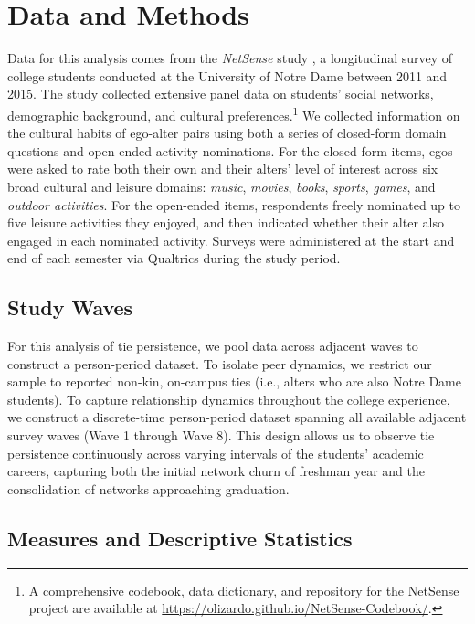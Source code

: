 \documentclass[
  letterpaper,
  DIV=11,
  numbers=noendperiod]{scrartcl}
\begin{document}
\section{Data and Methods}\label{data-and-methods}

Data for this analysis comes from the \textit{NetSense} study \citep{striegel2013lessons-595}, a longitudinal survey of college students conducted at the University of Notre Dame between 2011 and 2015. The study collected extensive panel data on students' social networks, demographic background, and cultural preferences.\footnote{A comprehensive codebook, data dictionary, and repository for the NetSense project are available at \url{https://olizardo.github.io/NetSense-Codebook/}.} We collected information on the cultural habits of ego-alter pairs using both a series of closed-form domain questions and open-ended activity nominations. For the closed-form items, egos were asked to rate both their own and their alters' level of interest across six broad cultural and leisure domains: \textit{music}, \textit{movies}, \textit{books}, \textit{sports}, \textit{games}, and \textit{outdoor activities}. For the open-ended items, respondents freely nominated up to five leisure activities they enjoyed, and then indicated whether their alter also engaged in each nominated activity. Surveys were administered at the start and end of each semester via Qualtrics during the study period. 

\subsection{Study Waves}\label{study-waves}

For this analysis of tie persistence, we pool data across adjacent waves to construct a person-period dataset. To isolate peer dynamics, we restrict our sample to reported non-kin, on-campus ties (i.e., alters who are also Notre Dame students). To capture relationship dynamics throughout the college experience, we construct a discrete-time person-period dataset spanning all available adjacent survey waves (Wave 1 through Wave 8). This design allows us to observe tie persistence continuously across varying intervals of the students’ academic careers, capturing both the initial network churn of freshman year and the consolidation of networks approaching graduation.

\subsection{Measures and Descriptive Statistics}\label{measures}
\end{document}
